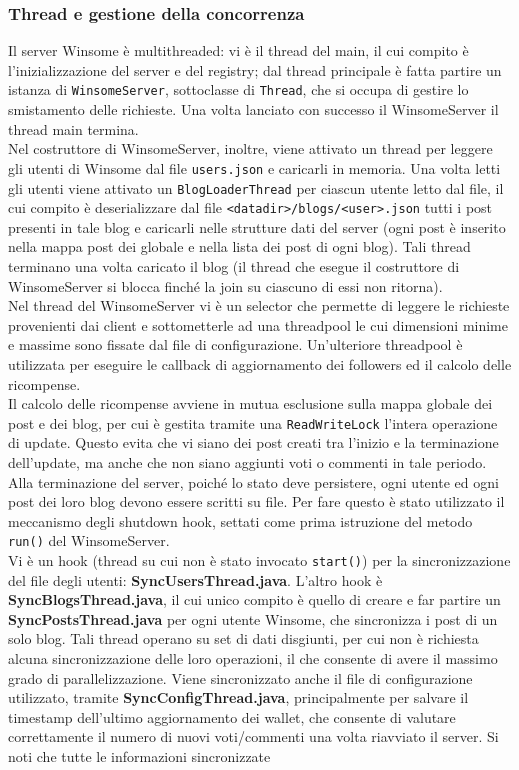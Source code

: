 \subsubsection{Thread e gestione della concorrenza}
Il server Winsome è multithreaded: vi è il thread del main, il cui compito è l'inizializzazione del server e del registry; dal thread principale è fatta partire un istanza di \verb|WinsomeServer|, sottoclasse di \verb|Thread|, che si occupa di gestire lo smistamento delle richieste. Una volta lanciato con successo il WinsomeServer il thread main termina.\\
Nel costruttore di WinsomeServer, inoltre, viene attivato un thread per leggere gli utenti di Winsome dal file \verb|users.json| e caricarli in memoria. Una volta letti gli utenti viene attivato un \verb|BlogLoaderThread| per ciascun utente letto dal file, il cui compito è deserializzare dal file \verb|<datadir>/blogs/<user>.json| tutti i post presenti in tale blog e caricarli nelle strutture dati del server (ogni post è inserito nella mappa post dei globale e nella lista dei post di ogni blog). Tali thread terminano una volta caricato il blog (il thread che esegue il costruttore di WinsomeServer si blocca finché la join su ciascuno di essi non ritorna).\\
Nel thread del WinsomeServer vi è un selector che permette di leggere le richieste provenienti dai client e sottometterle ad una threadpool le cui dimensioni minime e massime sono fissate dal file di configurazione. Un'ulteriore threadpool è utilizzata per eseguire le callback di aggiornamento dei followers ed il calcolo delle ricompense.\\
Il calcolo delle ricompense avviene in mutua esclusione sulla mappa globale dei post e dei blog, per cui è gestita tramite una \verb|ReadWriteLock| l'intera operazione di update.
Questo evita che vi siano dei post creati tra l'inizio e la terminazione dell'update, ma anche che non siano aggiunti voti o commenti in tale periodo.\\
Alla terminazione del server, poiché lo stato deve persistere, ogni utente ed ogni post dei loro blog devono essere scritti su file. Per fare questo è stato utilizzato
il meccanismo degli shutdown hook, settati come prima istruzione del metodo \verb|run()| del WinsomeServer.\\
Vi è un hook (thread su cui non è stato invocato \verb|start()|) per la sincronizzazione del file degli utenti: \textbf{SyncUsersThread.java}. L'altro hook è \textbf{SyncBlogsThread.java}, il cui unico compito è quello di creare e far partire un \textbf{SyncPostsThread.java} per ogni utente Winsome, che sincronizza i post di un solo blog. Tali thread operano su set di dati disgiunti, per cui non è richiesta alcuna sincronizzazione delle loro operazioni, il che consente di avere il massimo grado di parallelizzazione. Viene sincronizzato anche il file di configurazione utilizzato, tramite \textbf{SyncConfigThread.java}, principalmente per salvare il timestamp dell'ultimo aggiornamento dei wallet, che consente di valutare correttamente il numero di nuovi voti/commenti una volta riavviato il server. Si noti che tutte le informazioni sincronizzate

